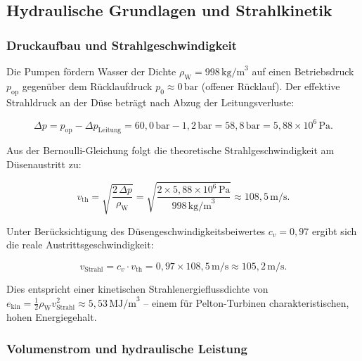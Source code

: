 ﻿\documentclass[a4paper,12pt]{article}
\begin{document}
\subsection{Hydraulische Grundlagen und Strahlkinetik}

\subsubsection{Druckaufbau und Strahlgeschwindigkeit}

Die Pumpen fördern Wasser der Dichte $\rho_\text{W} = 998\,\text{kg/m}^3$
auf einen Betriebsdruck $p_\text{op}$ gegenüber dem Rücklaufdruck
$p_0 \approx 0\,\text{bar}$ (offener Rücklauf). Der effektive Strahldruck
an der Düse beträgt nach Abzug der Leitungsverluste:

\begin{equation}
  \Delta p = p_\text{op} - \Delta p_\text{Leitung}
           = 60{,}0\,\text{bar} - 1{,}2\,\text{bar}
           = 58{,}8\,\text{bar}
           = 5{,}88 \times 10^6\,\text{Pa}.
  \label{eq:dp_eff}
\end{equation}

Aus der Bernoulli-Gleichung folgt die theoretische Strahlgeschwindigkeit
am Düsenaustritt zu:

\begin{equation}
  v_\text{th} = \sqrt{\frac{2\,\Delta p}{\rho_\text{W}}}
              = \sqrt{\frac{2 \times 5{,}88 \times 10^6\,\text{Pa}}{998\,\text{kg/m}^3}}
              \approx 108{,}5\,\text{m/s}.
  \label{eq:v_th}
\end{equation}

Unter Berücksichtigung des Düsengeschwindigkeitsbeiwertes $c_v = 0{,}97$
ergibt sich die reale Austrittsgeschwindigkeit:

\begin{equation}
  v_\text{Strahl} = c_v \cdot v_\text{th}
                  = 0{,}97 \times 108{,}5\,\text{m/s}
                  \approx 105{,}2\,\text{m/s}.
  \label{eq:v_strahl}
\end{equation}

Dies entspricht einer kinetischen Strahlenergieflussdichte von
$e_\text{kin} = \tfrac{1}{2}\rho_\text{W} v_\text{Strahl}^2
\approx 5{,}53\,\text{MJ/m}^3$ -- einem für Pelton-Turbinen
charakteristischen, hohen Energiegehalt.

\subsubsection{Volumenstrom und hydraulische Leistung}
\end{document}
